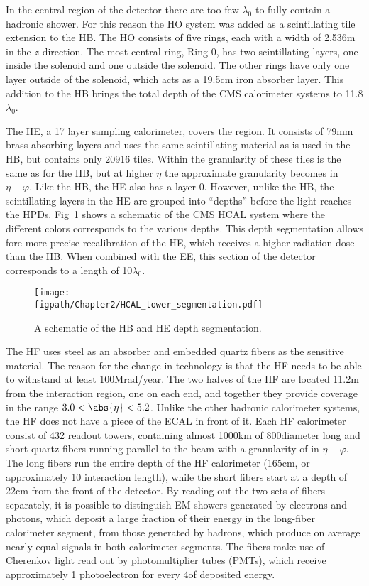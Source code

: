 In the central region of the detector there are too few $\lambda_{0}$ to fully contain a hadronic shower.
For this reason the HO system was added as a scintillating tile extension to the HB.
The HO consists of five rings, each with a width of 2.536\unit{m} in the $z$-direction.
The most central ring, Ring 0, has two scintillating layers, one inside the solenoid and one outside the solenoid.
The other rings have only one layer outside of the solenoid, which acts as a 19.5\unit{cm} iron absorber layer.
This addition to the HB brings the total depth of the CMS calorimeter systems to 11.8$\lambda_{0}$.

The HE, a 17 layer sampling calorimeter, covers the  region.
It consists of 79\unit{mm} brass absorbing layers and uses the same scintillating material as is used in the HB, but contains only 20916 tiles.
Within  the granularity of these tiles is the same as for the HB, but at higher $\eta$ the approximate granularity becomes  in $\eta-\varphi$.
Like the HB, the HE also has a layer 0.
However, unlike the HB, the scintillating layers in the HE are grouped into ``depths'' before the light reaches the HPDs.
Fig~\ref{fig:CMS_HCAL_depth} shows a schematic of the CMS HCAL system where the different colors corresponds to the various depths.
This depth segmentation allows fore more precise recalibration of the HE, which receives a higher radiation dose than the HB.
When combined with the EE, this section of the detector corresponds to a length of 10$\lambda_{0}$.

\begin{figure}[!hbt]
    \centering
    \texttt{[image: \\figpath/Chapter2/HCAL\_tower\_segmentation.pdf]}
    \caption{A schematic of the HB and HE depth segmentation.}
    \label{fig:CMS_HCAL_depth}
\end{figure}

The HF uses steel as an absorber and embedded quartz fibers as the sensitive material.
The reason for the change in technology is that the HF needs to be able to withstand at least 100\unit{Mrad/year}.
The two halves of the HF are located 11.2\unit{m} from the interaction region, one on each end, and together they provide coverage in the range $3.0<\abs{\eta}<5.2$.
Unlike the other hadronic calorimeter systems, the HF does not have a piece of the ECAL in front of it.
Each HF calorimeter consist of 432 readout towers, containing almost 1000\unit{km} of 800\mum diameter long and short quartz fibers running parallel to the beam with a granularity of  in $\eta-\varphi$.
The long fibers run the entire depth of the HF calorimeter (165\unit{cm}, or approximately 10 interaction length), while the short fibers start at a depth of 22\unit{cm} from the front of the detector.
By reading out the two sets of fibers separately, it is possible to distinguish EM showers generated by electrons and photons, which deposit a large fraction of their energy in the long-fiber calorimeter segment, from those generated by hadrons, which produce on average nearly equal signals in both calorimeter segments.
The fibers make use of Cherenkov light read out by photomultiplier tubes (PMTs), which receive approximately 1 photoelectron for every 4\gev of deposited energy.

